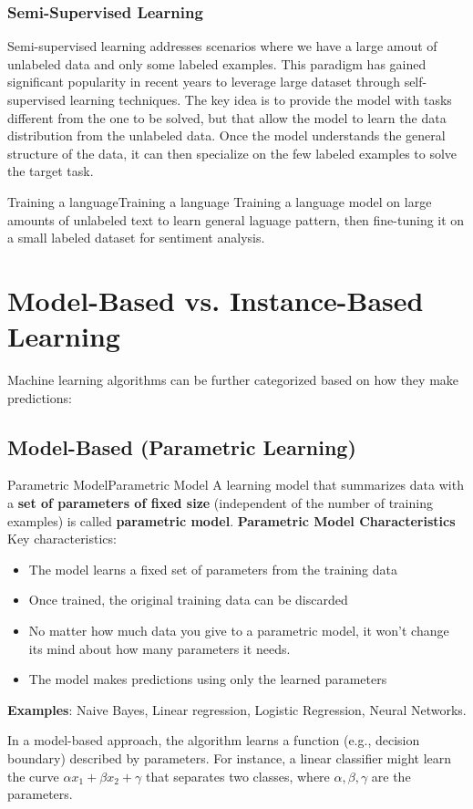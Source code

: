 \documentclass[a4paper]{article}
\theoremstyle{definition}
\begin{document}
\subsubsection{Semi-Supervised Learning}
Semi-supervised learning addresses scenarios where we have a large amout of unlabeled data and only some
labeled examples. This paradigm has gained significant popularity in recent years
to leverage large dataset through self-supervised learning techniques.
\vspace{1em}
\noindent
\newline
The key idea is to provide the model with tasks different from the one to be solved, but that allow 
the model to learn the data distribution from the unlabeled data. Once the model understands the general structure of 
the data, it can then specialize on the few labeled examples to solve the target task.
\begin{example}{Training a language}{Training a language}
Training a language model on large amounts of unlabeled text to learn general 
laguage pattern, then fine-tuning it on a small labeled dataset for sentiment analysis.
\end{example}
\section{Model-Based vs. Instance-Based Learning}
Machine learning algorithms can be further categorized based on how they make predictions:
\subsection{Model-Based (Parametric Learning)}
\begin{definition}{Parametric Model}{Parametric Model}
A learning model that summarizes data with a \textbf{set of parameters of fixed size} (independent of the number 
of training examples) is called \textbf{parametric model}.
\vspace{1em}
\noindent
\newline
\textbf{Parametric Model Characteristics}
\vspace{1em}
\noindent
\newline
Key characteristics:
\begin{itemize}
    \item The model learns a fixed set of parameters from the training data 
    \item Once trained, the original training data can be discarded 
    \item No matter how much data you give to a parametric model, it won't change its mind about how many parameters it needs.
    \item The model makes predictions using only the learned parameters
\end{itemize}
\textbf{Examples}: Naive Bayes, Linear regression, Logistic Regression, Neural Networks.
\end{definition}
In a model-based approach, the algorithm learns a function (e.g., decision boundary) described by parameters. For instance, a linear classifier might 
learn the curve \( \alpha x_1 + \beta x_2 + \gamma \) that separates 
two classes, where \( \alpha, \beta, \gamma \) are the parameters.
\end{document}
